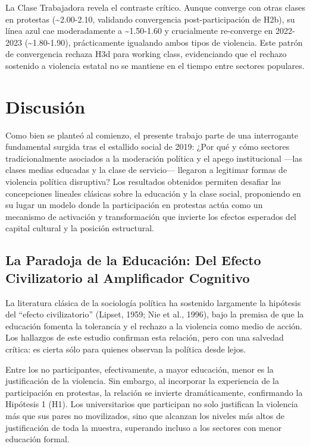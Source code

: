\documentclass[
  13pt,
]{article}
\begin{document}
La Clase Trabajadora revela el contraste crítico. Aunque converge con
otras clases en protestas (\textasciitilde2.00-2.10, validando
convergencia post-participación de H2b), su línea azul cae moderadamente
a \textasciitilde1.50-1.60 y crucialmente re-converge en 2022-2023
(\textasciitilde1.80-1.90), prácticamente igualando ambos tipos de
violencia. Este patrón de convergencia rechaza H3d para working class,
evidenciando que el rechazo sostenido a violencia estatal no se mantiene
en el tiempo entre sectores populares.

\section{Discusión}\label{discusiuxf3n}

Como bien se planteó al comienzo, el presente trabajo parte de una
interrogante fundamental surgida tras el estallido social de 2019: ¿Por
qué y cómo sectores tradicionalmente asociados a la moderación política
y el apego institucional ---las clases medias educadas y la clase de
servicio--- llegaron a legitimar formas de violencia política
disruptiva? Los resultados obtenidos permiten desafiar las concepciones
lineales clásicas sobre la educación y la clase social, proponiendo en
su lugar un modelo donde la participación en protestas actúa como un
mecanismo de activación y transformación que invierte los efectos
esperados del capital cultural y la posición estructural.

\subsection{La Paradoja de la Educación: Del Efecto Civilizatorio al
Amplificador
Cognitivo}\label{la-paradoja-de-la-educaciuxf3n-del-efecto-civilizatorio-al-amplificador-cognitivo}

La literatura clásica de la sociología política ha sostenido largamente
la hipótesis del ``efecto civilizatorio'' (Lipset, 1959; Nie et al.,
1996), bajo la premisa de que la educación fomenta la tolerancia y el
rechazo a la violencia como medio de acción. Los hallazgos de este
estudio confirman esta relación, pero con una salvedad crítica: es
cierta sólo para quienes observan la política desde lejos.

Entre los no participantes, efectivamente, a mayor educación, menor es
la justificación de la violencia. Sin embargo, al incorporar la
experiencia de la participación en protestas, la relación se invierte
dramáticamente, confirmando la Hipótesis 1 (H1). Los universitarios que
participan no solo justifican la violencia más que sus pares no
movilizados, sino que alcanzan los niveles más altos de justificación de
toda la muestra, superando incluso a los sectores con menor educación
formal.
\end{document}
